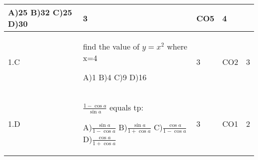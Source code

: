 \documentclass[12pt]{article}
\begin{document}
\begin{center}
\begin{longtable}{|L{1cm}|L{8cm}|C{1cm}|C{1cm}|C{1cm}|}
	A)25\newline
	B)32\newline
	C)25\newline
	D)30 &
	3 &
	CO5&
	4 \\ \hline
	
	1.C & find the value of   $y=x^{2}$  where x=4 \newline
	
	A)1\newline
	B)4\newline
	C)9\newline
	D)16 &
	3 &
	CO2&
	3 \\ \hline
	
	1.D & $\frac{1-\cos a}{\sin a}$  equals tp: \newline
	
	A)$\frac{\sin a}{1-\cos a}$\newline
	B)$\frac{\sin a}{1+\cos a}$\newline
	C)$\frac{\cos a}{1-\cos a}$\newline
	D)$\frac{\cos a}{1+\cos a}$ &
	3 &
	CO1&
	2 \\ \hline
	
	





\end{longtable}
\end{center}
\end{document}
